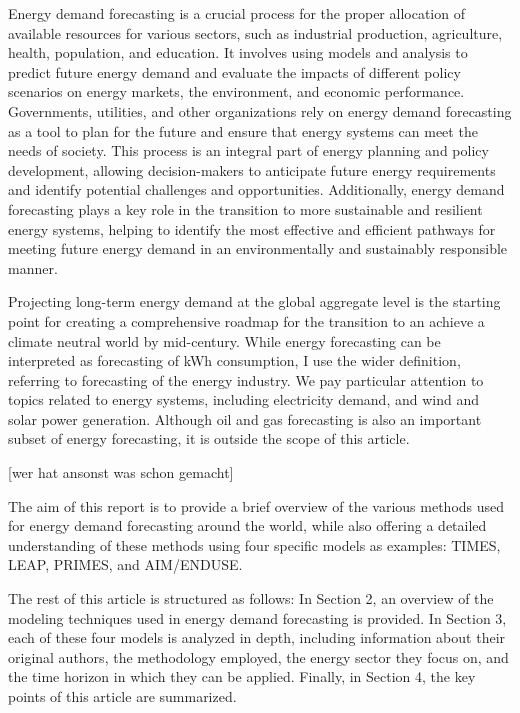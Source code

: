 \documentclass[lettersize,journal]{IEEEtran}
\begin{document}
Energy demand forecasting is a crucial process for the proper allocation of available resources for various sectors, such as industrial production, agriculture, health, population, and education. It involves using models and analysis to predict future energy demand and evaluate the impacts of different policy scenarios on energy markets, the environment, and economic performance. Governments, utilities, and other organizations rely on energy demand forecasting as a tool to plan for the future and ensure that energy systems can meet the needs of society. This process is an integral part of energy planning and policy development, allowing decision-makers to anticipate future energy requirements and identify potential challenges and opportunities. Additionally, energy demand forecasting plays a key role in the transition to more sustainable and resilient energy systems, helping to identify the most effective and efficient pathways for meeting future energy demand in an environmentally and sustainably responsible manner.

Projecting long-term energy demand at the global aggregate level is the starting point for creating a comprehensive roadmap for the transition to an achieve a climate neutral world by mid-century\cite{UNFCCC}. While energy forecasting can be interpreted as forecasting of kWh consumption, I use the wider definition, referring to forecasting of the energy industry. We pay particular attention to topics related to energy systems, including electricity demand, and wind and solar power generation. Although oil and gas forecasting is also an important subset of energy forecasting, it is outside the scope of this article.

[wer hat ansonst was schon gemacht]

The aim of this report is to provide a brief overview of the various methods used for energy demand forecasting around the world, while also offering a detailed understanding of these methods using four specific models as examples: TIMES, LEAP, PRIMES, and AIM/ENDUSE.

The rest of this article is structured as follows: In Section 2, an overview of the modeling techniques used in energy demand forecasting is provided. In Section 3, each of these four models is analyzed in depth, including information about their original authors, the methodology employed, the energy sector they focus on, and the time horizon in which they can be applied. Finally, in Section 4, the key points of this article are summarized.
\end{document}
